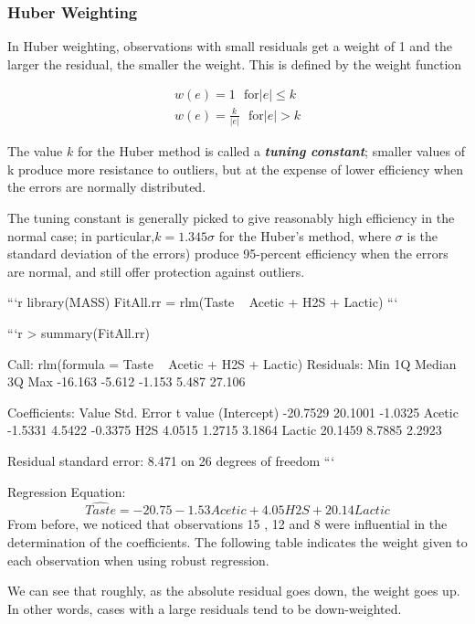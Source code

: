 \subsubsection{Huber Weighting}
In Huber weighting, observations with small residuals get a weight of 1 and the larger the residual, the smaller the weight. This is defined by the weight function


\begin{eqnarray}
w(e) = 1 \mbox{    } \mbox{for} |e| \leq k  \\
w(e) = \frac{k}{|e|} \mbox{    } \mbox{for} |e| > k
\end{eqnarray}


The value $k$ for the Huber method is called a \textbf{\textit{tuning constant}}; smaller values of k produce more resistance to outliers, but at the expense of lower efficiency when the errors are normally distributed.

The tuning constant is generally picked to give reasonably high efficiency in the normal case; in particular,$ k = 1.345\sigma$ for the Huber’s method, where $\sigma$ is the standard deviation of the errors) produce 95-percent efficiency when the errors are normal, and still offer protection against outliers.



```{r}
library(MASS)
FitAll.rr = rlm(Taste ~ Acetic + H2S + Lactic)
```


```{r}
> summary(FitAll.rr)

Call: rlm(formula = Taste ~ Acetic + H2S + Lactic)
Residuals:
    Min      1Q  Median      3Q     Max 
-16.163  -5.612  -1.153   5.487  27.106 

Coefficients:
            Value    Std. Error t value 
(Intercept) -20.7529  20.1001    -1.0325
Acetic       -1.5331   4.5422    -0.3375
H2S           4.0515   1.2715     3.1864
Lactic       20.1459   8.7885     2.2923

Residual standard error: 8.471 on 26 degrees of freedom
```

Regression Equation: 
\[ \hat{Taste} = -20.75 -1.53 Acetic + 4.05 H2S + 20.14 Lactic\]
From before, we noticed that observations 15 , 12 and 8 were influential in the determination of the coefficients. The following table indicates the weight given to each observation when using robust regression.  

We can see that roughly, as the absolute residual goes down, the weight goes up. In other words, cases with a large residuals tend to be down-weighted.

